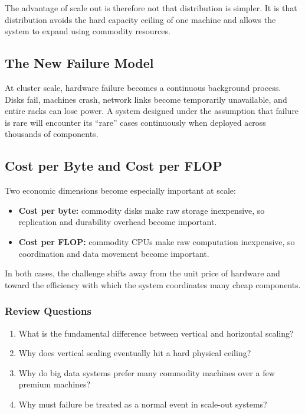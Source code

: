\documentclass[11pt,a4paper,oneside]{book}
\begin{document}
The advantage of scale out is therefore not that distribution is simpler. It is that distribution avoids the hard capacity ceiling of one machine and allows the system to expand using commodity resources.

\subsection{The New Failure Model}

At cluster scale, hardware failure becomes a continuous background process. Disks fail, machines crash, network links become temporarily unavailable, and entire racks can lose power. A system designed under the assumption that failure is rare will encounter its ``rare'' cases continuously when deployed across thousands of components.

\subsection{Cost per Byte and Cost per FLOP}

Two economic dimensions become especially important at scale:

\begin{itemize}
    \item \textbf{Cost per byte:} commodity disks make raw storage inexpensive, so replication and durability overhead become important.
    \item \textbf{Cost per FLOP:} commodity CPUs make raw computation inexpensive, so coordination and data movement become important.
\end{itemize}

In both cases, the challenge shifts away from the unit price of hardware and toward the efficiency with which the system coordinates many cheap components.

\subsubsection*{Review Questions}
\begin{enumerate}
    \item What is the fundamental difference between vertical and horizontal scaling?
    \item Why does vertical scaling eventually hit a hard physical ceiling?
    \item Why do big data systems prefer many commodity machines over a few premium machines?
    \item Why must failure be treated as a normal event in scale-out systems?
\end{enumerate}
\end{document}

